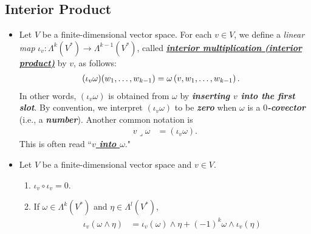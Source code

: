 \documentclass[11pt]{article}
\begin{document}
\subsection{Interior Product}
\begin{itemize}
\item \begin{definition}
Let $V$ be a finite-dimensional vector space. For each $v \in V$, we define a \emph{linear map} $\iota_v: \Lambda^k(V^{*}) \rightarrow \Lambda^{k-1}(V^{*})$, called \underline{\emph{\textbf{interior multiplication (interior product)}}} by $v$, as follows:
\begin{align*}
(\iota_v\omega)(w_1,\ldots, w_{k-1}) &= \omega\left(v, w_1,\ldots, w_{k-1}\right).
\end{align*} In other words, $(\iota_v\omega)$ is obtained from $\omega$ by \emph{\textbf{inserting $v$ into the first slot}}.  By convention, we interpret $(\iota_v\omega)$ to be \emph{\textbf{zero}} when $\omega$ is a \emph{\textbf{$0$-covector}} (i.e., a \emph{\textbf{number}}). Another common notation is
\begin{align*}
v \mathbin{\lrcorner } \omega &= (\iota_v\omega).
\end{align*}
This is often read ``\underline{\emph{\textbf{$v$ into $\omega$}}}."
\end{definition}

\item \begin{proposition}
Let $V$ be a finite-dimensional vector space and $v \in V$.
\begin{enumerate}
\item $ \iota_v \circ \iota_v = 0$.
\item If $\omega \in \Lambda^k(V^{*})$ and $\eta \in \Lambda^l(V^{*})$,
\begin{align}
\iota_v(\omega \wedge \eta) &= \iota_{v}(\omega) \wedge \eta + (-1)^{k}\omega \wedge \iota_v(\eta)  \label{eqn: interior_product_property}
\end{align}
\end{enumerate}
\end{proposition}


\end{itemize}
\end{document}
